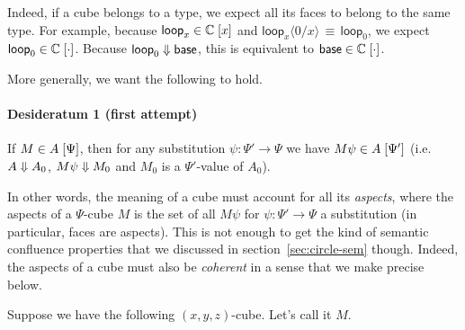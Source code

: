 \documentclass{article}
\newcommand\Circle{\mathbb{C}}
\newcommand\Base{\mathsf{base}}
\newcommand\Loop{\mathsf{loop}}
\newcommand\DimSubst[3]{#3\langle{#1}/{#2}\rangle}
\begin{document}
Indeed, if a cube belongs to a type, we expect all its faces to belong
to the same type. For example, because
$\InTypeDim{\Loop_x}{\Circle}{x}$ and
$\DimSubst{0}{x}{\Loop_x} \,\equiv\, \Loop_0$, we expect
$\InTypeDim{\Loop_0}{\Circle}{\cdot}$. Because $\eval{\Loop_0}{\Base}$, this is
equivalent to $\InTypeDim{\Base}{\Circle}{\cdot}$.

\begin{center}
\end{center}

More generally, we want the following to hold.

\paragraph{Desideratum 1 (first attempt)} 
If $M \in A \; [\Psi]$, then for any substitution
$\psi : \Psi' \to \Psi$ we have $M \psi \in A \; [\Psi']$
(i.e. $A \mathrel{\Downarrow} A_0$, $M \psi \mathrel{\Downarrow} M_0$ and $M_0$ is a
$\Psi'$-value of $A_0$).

\bigskip

In other words, the meaning of a cube must account for all its
\emph{aspects}, where the aspects of a $\Psi$-cube $M$ is the set of
all $M\psi$ for $\psi : \Psi' \to \Psi$ a substitution (in particular,
faces are aspects). This is not enough to get the kind of semantic
confluence properties that we discussed in
section~\ref{sec:circle-sem} though. Indeed, the aspects of a cube must
also be \emph{coherent} in a sense that we make precise below.

Suppose we have the following $(x,y,z)$-cube. Let's call it $M$.
\end{document}

